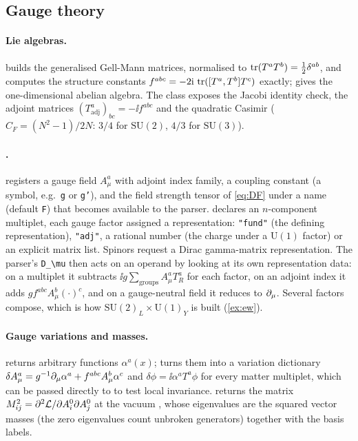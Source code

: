 \subsection{Gauge theory}
\label{sec:gauge-impl}

\paragraph{Lie algebras.}  builds the generalised Gell-Mann matrices, normalised to $\operatorname{tr}(T^aT^b)=\tfrac12\delta^{ab}$, and computes the structure constants $f^{abc}=-2\mathrm{i}\,\operatorname{tr}([T^a,T^b]T^c)$ exactly;  gives the one-dimensional abelian algebra. The class exposes the Jacobi identity check, the adjoint matrices $(T^a_{\mathrm{adj}})_{bc}=-\ii f^{abc}$ and the quadratic Casimir ($C_F=(N^2-1)/2N$: $3/4$ for $\mathrm{SU}(2)$, $4/3$ for $\mathrm{SU}(3)$).

\paragraph{.}  registers a gauge field $A^a_\mu$ with adjoint index family, a coupling constant (a symbol, e.g.\ \texttt{g} or \texttt{g'}), and the field strength tensor of \cref{eq:DF} under a name (default \texttt{F}) that becomes available to the parser.  declares an $n$-component multiplet, each gauge factor assigned a representation: \texttt{"fund"} (the defining representation), \texttt{"adj"}, a rational number (the charge under a $\mathrm U(1)$ factor) or an explicit matrix list. Spinors request a Dirac gamma-matrix representation. The parser's \verb|D_\mu| then acts on an operand by looking at its own representation data: on a multiplet it subtracts $\ii g\sum_{\text{groups}}A^a_\mu T^a_R$ for each factor, on an adjoint index it adds $gf^{abc}A^b_\mu(\cdot)^c$, and on a gauge-neutral field it reduces to $\partial_\mu$. Several factors compose, which is how $\mathrm{SU}(2)_L\times\mathrm U(1)_Y$ is built (\cref{ex:ew}).

\paragraph{Gauge variations and masses.}  returns arbitrary functions $\alpha^a(x)$;  turns them into a variation dictionary $\delta A^a_\mu=g^{-1}\partial_\mu\alpha^a+f^{abc}A^b_\mu\alpha^c$ and $\delta\phi=\ii\alpha^aT^a\phi$ for every matter multiplet, which can be passed directly to  to test local invariance.  returns the matrix $M^2_{ij}=\partial^2\mathcal L/\partial A_i^0\partial A_j^0$ at the vacuum , whose eigenvalues are the squared vector masses (the zero eigenvalues count unbroken generators) together with the basis labels.

